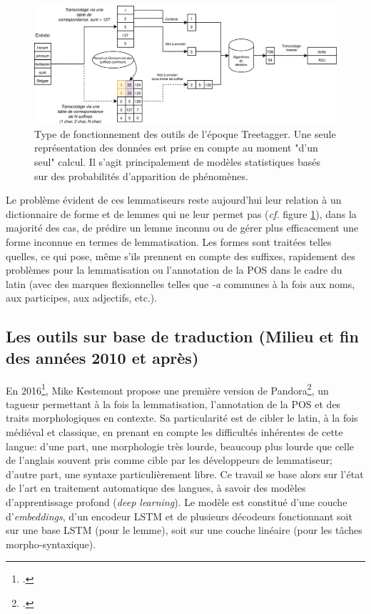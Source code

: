 \begin{figure}[h]
    \centering
    \includegraphics[width=\linewidth]{results/lemmatisation/outils/treetagger_type.png}
    \caption{Type de fonctionnement des outils de l'époque Treetagger. Une seule représentation des données est prise en compte au moment "d'un seul" calcul. Il s'agit principalement de modèles statistiques basés sur des probabilités d'apparition de phénomènes.}
    \label{lemmatisation:outils:type-treetagger}
\end{figure}

Le problème évident de ces lemmatiseurs reste aujourd'hui leur relation à un dictionnaire de forme et de lemmes qui ne leur permet pas (\textit{cf.} figure \ref{lemmatisation:outils:type-treetagger}), dans la majorité des cas, de prédire un lemme inconnu ou de gérer plus efficacement une forme inconnue en termes de lemmatisation. Les formes sont traitées telles quelles, ce qui pose, même s'ils prennent en compte des suffixes, rapidement des problèmes pour la lemmatisation ou l'annotation  de la POS dans le cadre du latin (avec des marques flexionnelles telles que \textit{-a} communes à la fois aux noms, aux participes, aux adjectifs, etc.).%

\subsection{Les outils sur base de traduction (Milieu et fin des années 2010 et après)}

En 2016\footcite{kestemont_initial_2016}, Mike Kestemont propose une première version de Pandora\footcite{kestemont_lemmatization_2017}, un tagueur permettant à la fois la lemmatisation, l'annotation de la POS et des traits morphologiques en contexte. Sa particularité est de cibler le latin, à la fois médiéval et classique, en prenant en compte les difficultés inhérentes de cette langue: d'une part, une morphologie très lourde, beaucoup plus lourde que celle de l'anglais souvent pris comme cible par les développeurs de lemmatiseur; d'autre part, une syntaxe particulièrement libre. Ce travail se base alors sur l'état de l'art en traitement automatique des langues, à savoir des modèles d'apprentissage profond (\textit{deep learning}). Le modèle est constitué d'une couche d'\textit{embeddings}, d'un encodeur LSTM et de plusieurs décodeurs fonctionnant soit sur une base LSTM (pour le lemme), soit sur une couche linéaire (pour les tâches morpho-syntaxique).


